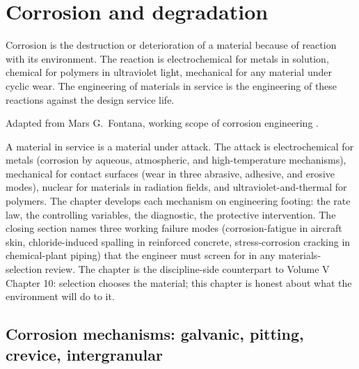 \chapter{Corrosion and degradation}
\label{vol05:ch09}

\epigraph{Corrosion is the destruction or deterioration of a material
because of reaction with its environment. The reaction is
electrochemical for metals in solution, chemical for polymers in
ultraviolet light, mechanical for any material under cyclic wear. The
engineering of materials in service is the engineering of these
reactions against the design service life.}{Adapted from Mars G.\
Fontana, working scope of corrosion engineering \cite[ch.~1, pp.~1--4]{
text:fontana-corrosion}.}


\noindent
A material in service is a material under attack. The attack is
electrochemical for metals (corrosion by aqueous, atmospheric, and
high-temperature mechanisms), mechanical for contact surfaces
(wear in three abrasive, adhesive, and erosive modes), nuclear for
materials in radiation fields, and ultraviolet-and-thermal for
polymers. The chapter develops each mechanism on engineering footing:
the rate law, the controlling variables, the diagnostic, the
protective intervention. The closing section names three working
failure modes (corrosion-fatigue in aircraft skin, chloride-induced
spalling in reinforced concrete, stress-corrosion cracking in
chemical-plant piping) that the engineer must screen for in any
materials-selection review. The chapter is the discipline-side
counterpart to Volume V Chapter 10: selection chooses the material;
this chapter is honest about what the environment will do to it.

\section{Corrosion mechanisms: galvanic, pitting, crevice, intergranular}


